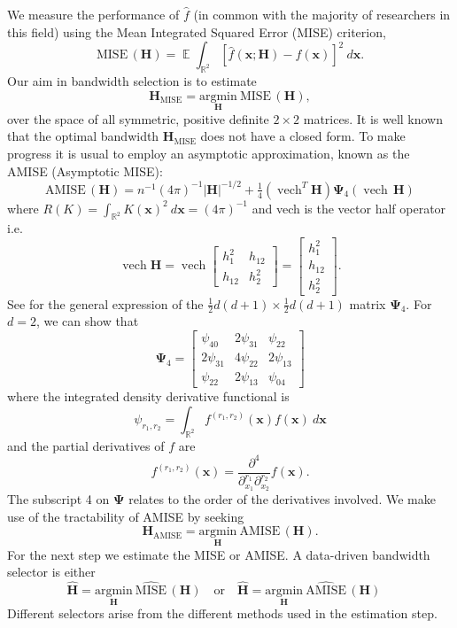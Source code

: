 \documentclass[a4paper,11pt]{article}
\renewcommand{\vec}[1]{\boldsymbol{#1}}
\newcommand{\mat}[1]{\mathbf{#1}}
\newcommand{\gmat}[1]{\boldsymbol{#1}}
\def\Hmat{\mat{H}}
\def\MISE{\mathrm{MISE}}
\def\AMISE{\mathrm{AMISE}}
\def\vecx{\vec{x}}
\def\intr2{\int_{\boldsymbol{\mathbb{R}}^2}}
\DeclareMathOperator{\E}{\boldsymbol{\mathbb{E}}}
\DeclareMathOperator{\VECH}{vech}
\begin{document}
We measure the performance of $\hat f$ (in common with the 
majority of researchers in this field) 
using the Mean Integrated Squared Error (MISE) criterion, 
$$
\MISE \, (\Hmat)
= \E \int_{\mathbb{R}^2} [ \hat{f}(\vecx; \Hmat) - f(\vecx) ] ^2
\ d \vecx.
$$
Our aim in bandwidth selection is to estimate
$$\Hmat_\MISE = \underset{\Hmat}{\mathrm{argmin}} \
\MISE \,(\Hmat),
$$
over the space of all symmetric, positive definite $2 \times 2$ 
matrices. It is
well known that the optimal bandwidth $\Hmat_{\MISE}$ does not have a closed form. 
To make progress it is usual to employ an asymptotic approximation, known 
as the AMISE (Asymptotic MISE): 
\begin{equation}
\AMISE \,(\Hmat) =  n^{-1}  (4\pi)^{-1}  |\Hmat| ^{-1/2}
 + \tfrac{1}{4} (\VECH^T \Hmat) \gmat{\Psi}_4(\VECH \, \Hmat)
\label{eq:amise}
\end{equation}
where $R(K) = \intr2 K(\vecx)^2 \ d\vecx = (4\pi)^{-1}$ and
vech is the vector half 
operator i.e.
$$\VECH \Hmat = \VECH \begin{bmatrix} h_1^2  & h_{12} \\ h_{12} & h_2^2 \end{bmatrix}
= \begin{bmatrix} h_1^2 \\ h_{12} \\ h_2^2 \end{bmatrix}.$$ 
See \citet*[p.~98]{wand1995} for the general expression of 
the $\frac{1}{2}d(d+1) \times \frac{1}{2}d(d+1)$ matrix $\gmat{\Psi}_4$. 
For $d=2$, we 
can show that
\begin{equation}
\gmat{\Psi}_4 =
\begin{bmatrix}\psi_{40} & 2\psi_{31} & \psi_{22} \\
2\psi_{31} & 4\psi_{22} & 2\psi_{13} \\
\psi_{22} & 2\psi_{13} & \psi_{04}
\end{bmatrix}
\label{Psi}
\end{equation}
where the integrated density derivative functional is
$$
\psi_{r_1, r_2} = \int_{\mathbb{R}^2} 
f^{(r_1, r_2)} (\vecx) f(\vecx)\ d \vecx
$$
and the partial derivatives of $f$ are $$
f^{(r_1, r_2)} (\vecx) =  \frac{\partial^{4}} 
{\partial^{r_1}_{x_1} \partial^{r_2}_{x_2}} f(\vecx). 
$$
The subscript 4 on $\gmat{\Psi}$ relates to the order of the 
derivatives involved.
We make use of the tractability of AMISE by seeking
$$
\Hmat_\AMISE = \underset{\Hmat}{\mathrm{argmin}} \ \AMISE \,
(\Hmat).
$$ 
For the next step we estimate the MISE or AMISE. A data-driven bandwidth selector
is either \begin{equation} 
\hat{\Hmat} = \underset{\Hmat}{\mathrm{argmin}} \ \widehat{\MISE} \,
(\Hmat) \quad \mathrm{or} \quad 
\hat{\Hmat} = \underset{\Hmat}{\mathrm{argmin}} \ \widehat{\AMISE} \,
(\Hmat) \quad
\end{equation}
Different selectors arise from the different methods used in the estimation
step.
\end{document}
